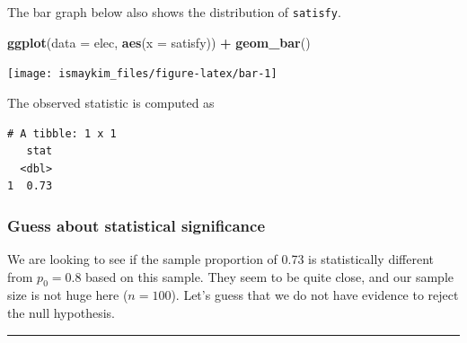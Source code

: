 \documentclass[12pt,]{krantz}
\makeatletter
\newenvironment{Shaded}{\begin{snugshade}}{\end{snugshade}}
\newcommand{\KeywordTok}[1]{\textcolor[rgb]{0.27,0.27,0.27}{\textbf{#1}}}
\newcommand{\DataTypeTok}[1]{\textcolor[rgb]{0.27,0.27,0.27}{#1}}
\newcommand{\StringTok}[1]{\textcolor[rgb]{0.5,0.5,0.5}{#1}}
\newcommand{\OperatorTok}[1]{\textcolor[rgb]{0.43,0.43,0.43}{\textbf{#1}}}
\newcommand{\NormalTok}[1]{#1}
\newenvironment{kframe}{%
\medskip{}
\setlength{\fboxsep}{.8em}
 \def\at@end@of@kframe{}%
 \ifinner\ifhmode%
  \def\at@end@of@kframe{\end{minipage}}%
  \begin{minipage}{\columnwidth}%
 \fi\fi%
 \def\FrameCommand##1{\hskip\@totalleftmargin \hskip-\fboxsep
 \colorbox{shadecolor}{##1}\hskip-\fboxsep
     \hskip-\linewidth \hskip-\@totalleftmargin \hskip\columnwidth}%
 \MakeFramed {\advance\hsize-\width
   \@totalleftmargin\z@ \linewidth\hsize
   \@setminipage}}%
 {\par\unskip\endMakeFramed%
 \at@end@of@kframe}
\renewenvironment{Shaded}{\begin{kframe}}{\end{kframe}}
\theoremstyle{definition}
\theoremstyle{definition}
\theoremstyle{definition}
\theoremstyle{remark}
\makeatother
\begin{document}
The bar graph below also shows the distribution of \texttt{satisfy}.

\begin{Shaded}
\begin{Highlighting}[]
\KeywordTok{ggplot}\NormalTok{(}\DataTypeTok{data =}\NormalTok{ elec, }\KeywordTok{aes}\NormalTok{(}\DataTypeTok{x =}\NormalTok{ satisfy)) }\OperatorTok{+}\StringTok{ }
\StringTok{  }\KeywordTok{geom_bar}\NormalTok{()}
\end{Highlighting}
\end{Shaded}

\begin{center}\texttt{[image: ismaykim\_files/figure-latex/bar-1]} \end{center}

The observed statistic is computed as

\begin{Shaded}
\end{Shaded}

\begin{verbatim}
# A tibble: 1 x 1
   stat
  <dbl>
1  0.73
\end{verbatim}

\subsubsection*{Guess about statistical
significance}\label{guess-about-statistical-significance-1}

We are looking to see if the sample proportion of 0.73 is statistically
different from \(p_0 = 0.8\) based on this sample. They seem to be quite
close, and our sample size is not huge here (\(n = 100\)). Let's guess
that we do not have evidence to reject the null hypothesis.

\begin{center}\rule{0.5\linewidth}{\linethickness}\end{center}
\end{document}

